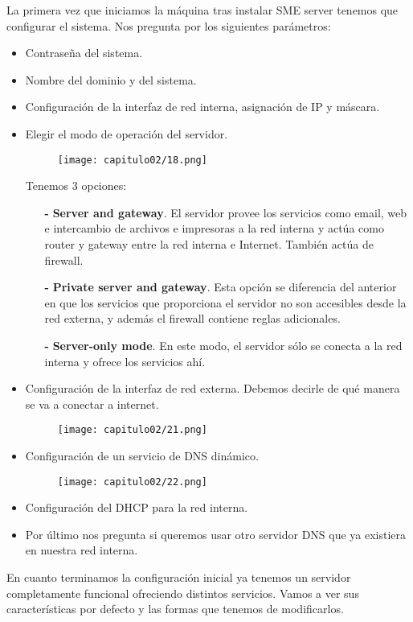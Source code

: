 La primera vez que iniciamos la máquina tras instalar SME server tenemos que configurar el sistema. Nos pregunta por los siguientes parámetros:

\begin{itemize}
\item Contraseña del sistema.
\item Nombre del dominio y del sistema.
\item Configuración de la interfaz de red interna, asignación de IP y máscara.
\item Elegir el modo de operación del servidor.
\begin{figure}[H]
    \centering
    \texttt{[image: capitulo02/18.png]}
\end{figure}
Tenemos 3 opciones:
\begin{itemize}
\item[\textbf{-}] \textbf{Server and gateway}. El servidor provee los servicios como email, web e intercambio de archivos e impresoras a la red interna y actúa como router y gateway entre la red interna e Internet. También actúa de firewall.
\item[\textbf{-}] \textbf{Private server and gateway}. Esta opción se diferencia del anterior en que los servicios que proporciona el servidor no son accesibles desde la red externa, y además el firewall contiene reglas adicionales.
\item[\textbf{-}] \textbf{Server-only mode}. En este modo, el servidor sólo se conecta a la red interna y ofrece los servicios ahí.
\end{itemize}
\item Configuración de la interfaz de red externa. Debemos decirle de qué manera se va a conectar a internet.
\begin{figure}[H]
  \centering
  \texttt{[image: capitulo02/21.png]}
\end{figure}
\item Configuración de un servicio de DNS dinámico.
\begin{figure}[H]
    \centering
    \texttt{[image: capitulo02/22.png]}
\end{figure}
\item Configuración del DHCP para la red interna.
\item Por último nos pregunta si queremos usar otro servidor DNS que ya existiera en nuestra red interna.
\end{itemize}

En cuanto terminamos la configuración inicial ya tenemos un servidor completamente funcional ofreciendo distintos servicios. Vamos a ver sus características por defecto y las formas que tenemos de modificarlos.

